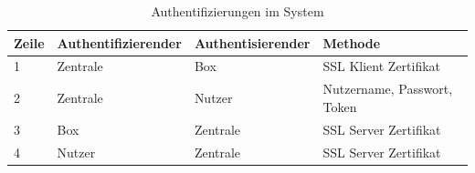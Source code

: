 \begin{table}[h]
	\begin{tabular}{ | l | l | l | l |}
		\hline
		\textbf{Zeile} & \textbf{Authentifizierender} & \textbf{Authentisierender} &  \textbf{Methode} \\ \hline
		1 & Zentrale & Box      & SSL Klient Zertifikat \\ \hline
		2 & Zentrale & Nutzer   & Nutzername, Passwort, Token \\ \hline
		3 & Box      & Zentrale & SSL Server Zertifikat \\ \hline
		4 & Nutzer   & Zentrale & SSL Server Zertifikat \\ \hline
		
	\end{tabular}
	\caption{Authentifizierungen im System}
	\label{tab:authentifizierungen}
\end{table}

